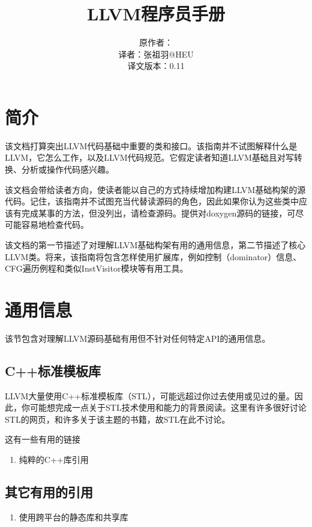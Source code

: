 \documentclass[12pt,a4paper]{article}
\title{LLVM程序员手册}
\author{原作者：\\译者：张祖羽@HEU\\译文版本：0.11}
\begin{document}
\maketitle

\section{简介}

该文档打算突出LLVM代码基础中重要的类和接口。该指南并不试图解释什么是LLVM，它怎么工作，以及LLVM代码规范。它假定读者知道LLVM基础且对写转换、分析或操作代码感兴趣。

该文档会带给读者方向，使读者能以自己的方式持续增加构建LLVM基础构架的源代码。记住，该指南并不试图充当代替读源码的角色，因此如果你认为这些类中应该有完成某事的方法，但没列出，请检查源码。提供对doxygen源码的链接，可尽可能容易地检查代码。

该文档的第一节描述了对理解LLVM基础构架有用的通用信息，第二节描述了核心LLVM类。将来，该指南将包含怎样使用扩展库，例如控制（dominator）信息、CFG遍历例程和类似InstVisitor模块等有用工具。

\section{通用信息}

该节包含对理解LLVM源码基础有用但不针对任何特定API的通用信息。

\subsection{C++标准模板库}

LLVM大量使用C++标准模板库（STL），可能远超过你过去使用或见过的量。因此，你可能想完成一点关于STL技术使用和能力的背景阅读。这里有许多很好讨论STL的网页，和许多关于该主题的书籍，故STL在此不讨论。

这有一些有用的链接

\begin{enumerate}
\item
\begin{description}
\item[纯粹的C++库引用]
\end{description}
\end{enumerate}

\subsection{其它有用的引用}

\begin{enumerate}
\item 使用跨平台的静态库和共享库
\end{enumerate}
\end{document}
